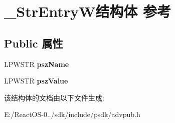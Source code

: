 \hypertarget{struct___str_entry_w}{}\section{\+\_\+\+Str\+Entry\+W结构体 参考}
\label{struct___str_entry_w}
\subsection*{Public 属性}
\begin{DoxyCompactItemize}
\item 
\mbox{\label{struct___str_entry_w_aa22a83d8da702281cba6f1b022924909}} 
L\+P\+W\+S\+TR {\bfseries psz\+Name}
\item 
\mbox{\label{struct___str_entry_w_a1261e468c76695956b9b416e7a469145}} 
L\+P\+W\+S\+TR {\bfseries psz\+Value}
\end{DoxyCompactItemize}


该结构体的文档由以下文件生成\+:\begin{DoxyCompactItemize}
\item 
E\+:/\+React\+O\+S-\/0../sdk/include/psdk/advpub.\+h\end{DoxyCompactItemize}
